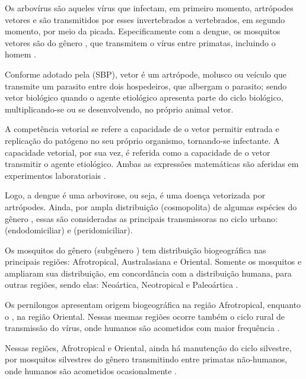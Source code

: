 \indent Os arbovírus são aqueles vírus que infectam, em primeiro momento, artrópodes vetores e são transmitidos por esses invertebrados a vertebrados, em segundo momento, por meio da picada. Especificamente com a dengue, os mosquitos vetores são do gênero , que transmitem o vírus entre primatas, incluindo o homem \cite{Valle2015Dengue}.

\indent Conforme adotado pela  (\acrshort{SBP}), vetor é um artrópode, molusco ou veículo que transmite um parasito entre dois hospedeiros, que albergam o parasito; sendo vetor biológico quando o agente etiológico apresenta parte do ciclo biológico, multiplicando-se ou se desenvolvendo, no próprio animal vetor.

\indent A competência vetorial se refere a capacidade de o vetor permitir entrada e replicação do patógeno no seu próprio organismo, tornando-se infectante. A capacidade vetorial, por sua vez, é referida como a capacidade de o vetor transmitir o agente etiológico. Ambas as expressões matemáticas são aferidas em experimentos laboratoriais  \cite{OTPCampo}.

\indent Logo, a dengue é uma arbovirose, ou seja, é uma doença vetorizada por artrópodes. Ainda, por ampla distribuição (cosmopolita) de algumas espécies do gênero , essas são consideradas as principais transmissoras no ciclo urbano:  (endodomiciliar) e   (peridomiciliar)\cite{ArboviralTransmission}.

\indent Os mosquitos do gênero  (subgênero ) tem distribuição biogeográfica nas principais regiões: Afrotropical, Australasiana e Oriental. Somente os mosquitos  e  ampliaram sua distribuição, em concordância com a distribuição humana, para outras regiões, sendo elas: Neoártica, Neotropical e Paleoártica  \cite{Valle2015Dengue}.

\indent Os pernilongos  apresentam origem biogeográfica na região Afrotropical, enquanto o , na região Oriental. Nessas mesmas regiões ocorre também o ciclo rural de transmissão do vírus, onde humanos são acometidos com maior frequência \cite{Valle2015Dengue}.

\indent Nessas regiões, Afrotropical e Oriental, ainda há manutenção do ciclo silvestre, por mosquitos silvestres do gênero  transmitindo entre primatas não-humanos, onde humanos são acometidos ocasionalmente \cite{Valle2015Dengue}.

